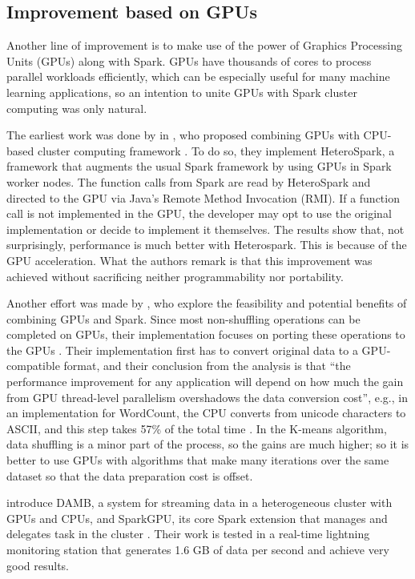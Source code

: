 \documentclass{article}
\begin{document}
\subsection{Improvement based on GPUs}

Another line of improvement is to make use of the power of Graphics Processing Units (GPUs) along with Spark. GPUs have thousands of cores to process parallel workloads efficiently, which can be especially useful for many machine learning applications, so an intention to unite GPUs with Spark cluster computing was only natural.

The earliest work was done by \citeauthor{Li2015} in \citeyear{Li2015}, who proposed combining GPUs with CPU-based cluster computing framework \cite{Li2015}. To do so, they implement HeteroSpark, a framework that augments the usual Spark framework by using GPUs in Spark worker nodes. The function calls from Spark are read by HeteroSpark and directed to the GPU via Java's Remote Method Invocation (RMI). If a function call is not implemented in the GPU, the developer may opt to use the original implementation or decide to implement it themselves. The results show that, not surprisingly, performance is much better with Heterospark. This is because of the GPU acceleration. What the authors remark is that this improvement was achieved without sacrificing neither programmability nor portability.

Another effort was made by \citeauthor{Manzi2016}, who explore the feasibility and potential benefits of combining GPUs and Spark. Since most non-shuffling operations can be completed on GPUs, their implementation focuses on porting these operations to the GPUs \cite{Manzi2016}. Their implementation first has to convert original data to a GPU-compatible format, and their conclusion from the analysis is that ``the performance improvement for any application will depend on how much the gain from GPU thread-level parallelism overshadows the data conversion cost'', e.g., in an implementation for WordCount, the CPU converts from unicode characters to ASCII, and this step takes 57\% of the total time \cite{Manzi2016}. In the K-means algorithm, data shuffling is a minor part of the process, so the gains are much higher; so it is better to use GPUs with algorithms that make many iterations over the same dataset so that the data preparation cost is offset.

\citeauthor{Hassaan2016} introduce DAMB, a system for streaming data in a heterogeneous cluster with GPUs and CPUs, and SparkGPU, its core Spark extension that manages and delegates task in the cluster \cite{Hassaan2016}. Their work is tested in a real-time lightning monitoring station that generates 1.6 GB of data per second and achieve very good results. 
\end{document}
